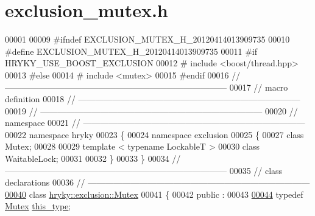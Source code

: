 \hypertarget{exclusion__mutex_8h_source}{\section{exclusion\-\_\-mutex.\-h}
}

\begin{DoxyCode}
00001 
00009 \textcolor{preprocessor}{#ifndef EXCLUSION\_MUTEX\_H\_20120414013909735}
00010 \textcolor{preprocessor}{}\textcolor{preprocessor}{#define EXCLUSION\_MUTEX\_H\_20120414013909735}
00011 \textcolor{preprocessor}{}\textcolor{preprocessor}{#if HRYKY\_USE\_BOOST\_EXCLUSION}
00012 \textcolor{preprocessor}{}\textcolor{preprocessor}{#   include <boost/thread.hpp>}
00013 \textcolor{preprocessor}{#else}
00014 \textcolor{preprocessor}{}\textcolor{preprocessor}{#   include <mutex>}
00015 \textcolor{preprocessor}{#endif}
00016 \textcolor{preprocessor}{}\textcolor{comment}{//
      ------------------------------------------------------------------------------}
00017 \textcolor{comment}{// macro definition}
00018 \textcolor{comment}{//
      ------------------------------------------------------------------------------}
00019 \textcolor{comment}{//
      ------------------------------------------------------------------------------}
00020 \textcolor{comment}{// namespace}
00021 \textcolor{comment}{//
      ------------------------------------------------------------------------------}
00022 \textcolor{keyword}{namespace }hryky
00023 \{
00024 \textcolor{keyword}{namespace }exclusion
00025 \{
00027     \textcolor{keyword}{class }Mutex;
00028 
00029     \textcolor{keyword}{template} < \textcolor{keyword}{typename} LockableT >
00030     \textcolor{keyword}{class }WaitableLock;
00031 
00032 \}
00033 \}
00034 \textcolor{comment}{//
      ------------------------------------------------------------------------------}
00035 \textcolor{comment}{// class declarations}
00036 \textcolor{comment}{//
      ------------------------------------------------------------------------------}
\hypertarget{exclusion__mutex_8h_source_l00040}{}\hyperlink{classhryky_1_1exclusion_1_1_mutex}{00040} \textcolor{comment}{}\textcolor{keyword}{class }\hyperlink{classhryky_1_1exclusion_1_1_mutex}{hryky::exclusion::Mutex}
00041 \{
00042 \textcolor{keyword}{public} :
00043 
\hypertarget{exclusion__mutex_8h_source_l00044}{}\hyperlink{classhryky_1_1exclusion_1_1_mutex_adabc1c45a533006a1d21b671207415ad}{00044}     \textcolor{keyword}{typedef} \hyperlink{classhryky_1_1exclusion_1_1_mutex}{Mutex}           \hyperlink{classhryky_1_1exclusion_1_1_mutex_adabc1c45a533006a1d21b671207415ad}{this_type};

\end{DoxyCode}
